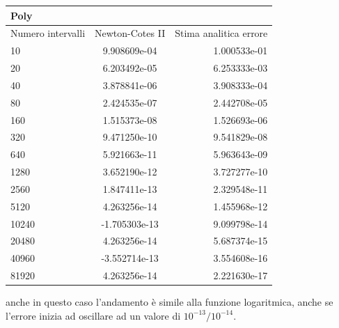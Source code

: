\begin{center}
\begin{longtable}[h]{lcr}
\toprule
Poly & & \\
\midrule
Numero intervalli & Newton-Cotes II & Stima analitica errore  \\
\midrule
10 & 	  9.908609e-04 & 	  1.000533e-01 \\  
20 & 	  6.203492e-05 & 	  6.253333e-03 \\  
40 & 	  3.878841e-06 & 	  3.908333e-04 \\  
80 & 	  2.424535e-07 & 	  2.442708e-05 \\  
160 & 	  1.515373e-08 & 	  1.526693e-06 \\  
320 & 	  9.471250e-10 & 	  9.541829e-08 \\  
640 & 	  5.921663e-11 & 	  5.963643e-09 \\  
1280 & 	  3.652190e-12 & 	  3.727277e-10 \\  
2560 & 	  1.847411e-13 & 	  2.329548e-11 \\  
5120 & 	  4.263256e-14 & 	  1.455968e-12 \\  
10240 & -1.705303e-13  	 & 9.099798e-14 \\  
20480 & 4.263256e-14  	 & 5.687374e-15 \\  
40960 & -3.552714e-13 	 & 3.554608e-16 \\  
81920 & 4.263256e-14  	 & 2.221630e-17 \\  

\bottomrule
\end{longtable}
\end{center}
anche in questo caso l'andamento è simile alla funzione logaritmica, anche se l'errore inizia ad oscillare ad un valore di $10^{-13}/10^{-14}$. \\ 
